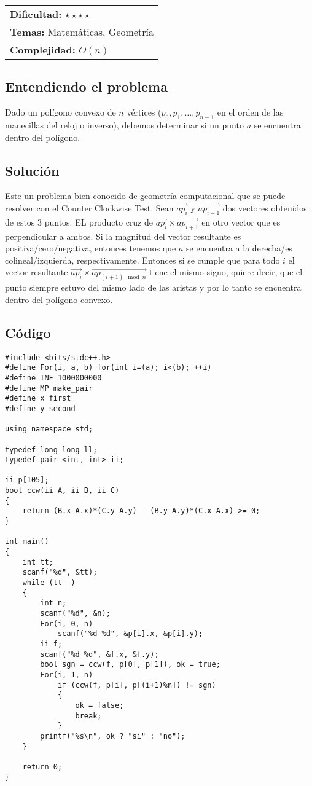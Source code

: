 \hfill
\begin{tabular}{@{}l@{}}
\textbf{Dificultad:} $\star\star\star \star$ \\
\textbf{Temas:} Matemáticas, Geometría \\
\textbf{Complejidad:} $O(n)$
\end{tabular}

\subsection*{Entendiendo el problema}
Dado un polígono convexo de $n$ vértices ($p_0, p_1, \dots , p_{n-1}$ en el orden de las manecillas del reloj o inverso), debemos determinar si un punto $a$ se encuentra dentro del polígono.
\subsection*{Solución}
Este un problema bien conocido de geometría computacional que se puede resolver con el Counter Clockwise Test.
Sean $\overrightarrow{ap_i}$ y $\overrightarrow{ap_{i+1}}$ dos vectores obtenidos de estos $3$ puntos. EL producto cruz de $\overrightarrow{ap_i} \times \overrightarrow{ap_{i+1}}$ en otro vector que es perpendicular a ambos. Si la magnitud del vector resultante es positiva/cero/negativa, entonces tenemos que $a$ se encuentra a la derecha/es colineal/izquierda, respectivamente. Entonces si se cumple que para todo $i$ el vector resultante $\overrightarrow{ap_i} \times \overrightarrow{ap_{(i+1) \mod n}}$ tiene el mismo signo, quiere decir, que el punto siempre estuvo del mismo lado de las aristas y por lo tanto se encuentra dentro del polígono convexo.

\subsection*{Código}
\begin{verbatim}
#include <bits/stdc++.h>
#define For(i, a, b) for(int i=(a); i<(b); ++i)
#define INF 1000000000
#define MP make_pair
#define x first
#define y second

using namespace std;

typedef long long ll;
typedef pair <int, int> ii;

ii p[105];
bool ccw(ii A, ii B, ii C)
{
	return (B.x-A.x)*(C.y-A.y) - (B.y-A.y)*(C.x-A.x) >= 0;
}

int main()
{
	int tt;
	scanf("%d", &tt);
	while (tt--)
	{
		int n;
		scanf("%d", &n);
		For(i, 0, n)
			scanf("%d %d", &p[i].x, &p[i].y);
		ii f;
		scanf("%d %d", &f.x, &f.y);
		bool sgn = ccw(f, p[0], p[1]), ok = true;
		For(i, 1, n)
			if (ccw(f, p[i], p[(i+1)%n]) != sgn)
			{
				ok = false;
				break;
			}
		printf("%s\n", ok ? "si" : "no");
	}

	return 0;
}
\end{verbatim}


